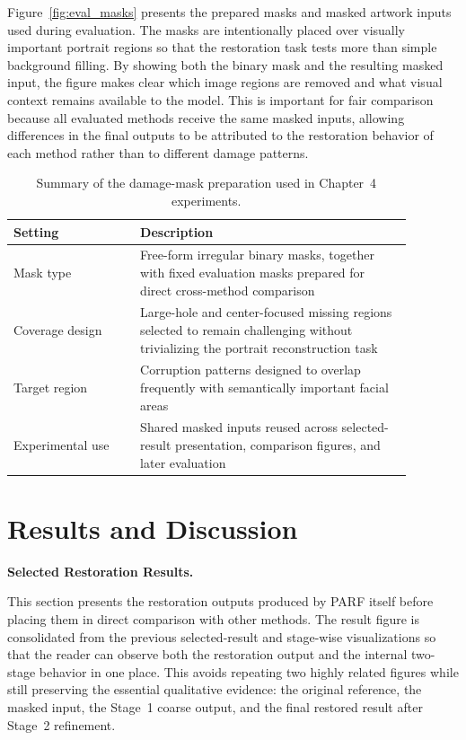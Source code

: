 \documentclass[12pt, twoside]{report}
\begin{document}
Figure~\ref{fig:eval_masks} presents the prepared masks and masked artwork inputs used during evaluation. The masks are intentionally placed over visually important portrait regions so that the restoration task tests more than simple background filling. By showing both the binary mask and the resulting masked input, the figure makes clear which image regions are removed and what visual context remains available to the model. This is important for fair comparison because all evaluated methods receive the same masked inputs, allowing differences in the final outputs to be attributed to the restoration behavior of each method rather than to different damage patterns.

\begin{table}[H]
\centering
\caption{Summary of the damage-mask preparation used in Chapter~4 experiments.}
\label{tab:eval_mask_summary}
\begin{tabular}{p{0.28\linewidth} p{0.6\linewidth}}
\toprule
\textbf{Setting} & \textbf{Description} \\
\midrule
Mask type & Free-form irregular binary masks, together with fixed evaluation masks prepared for direct cross-method comparison \\
Coverage design & Large-hole and center-focused missing regions selected to remain challenging without trivializing the portrait reconstruction task \\
Target region & Corruption patterns designed to overlap frequently with semantically important facial areas \\
Experimental use & Shared masked inputs reused across selected-result presentation, comparison figures, and later evaluation \\
\bottomrule
\end{tabular}
\end{table}

\section{Results and Discussion}

\vspace{0.35\baselineskip}
\noindent\textbf{Selected Restoration Results.}\par

This section presents the restoration outputs produced by PARF itself before placing them in direct comparison with other methods. The result figure is consolidated from the previous selected-result and stage-wise visualizations so that the reader can observe both the restoration output and the internal two-stage behavior in one place. This avoids repeating two highly related figures while still preserving the essential qualitative evidence: the original reference, the masked input, the Stage~1 coarse output, and the final restored result after Stage~2 refinement.
\end{document}
